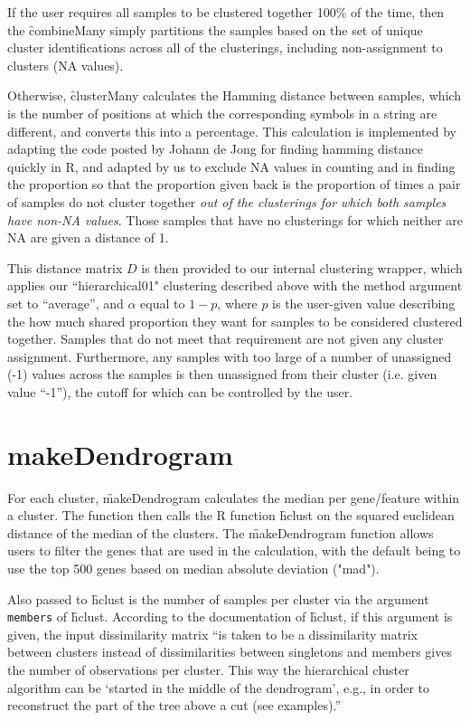 If the user requires all samples to be clustered together 100\% of the time, then the \f{combineMany} simply partitions the samples based on the set of unique cluster identifications across all of the clusterings, including non-assignment to clusters (NA values).  

Otherwise, \f{clusterMany} calculates the Hamming distance between samples, which is the number of positions at which the corresponding symbols in a string are different, and converts this into a percentage. This calculation is implemented by adapting the code posted by Johann de Jong \cite{hammingR} for finding hamming distance quickly in R, and adapted by us to exclude NA values in counting and in finding the proportion so that the proportion given back is the proportion of times a pair of samples do not cluster together \emph{out of the clusterings for which both samples have non-NA values}. Those samples that have no clusterings for which neither are NA are given a distance of 1. 



This distance matrix $D$ is then provided to our internal clustering wrapper, which applies our ``hierarchical01" clustering described above with the method argument set to ``average'', and $\alpha$ equal to $1-p$, where $p$ is the user-given value describing the how much shared proportion they want for samples to be considered clustered together. Samples that do not meet that requirement are not given any cluster assignment. Furthermore, any samples with too large of a number of unassigned (-1) values across the samples is then unassigned from their cluster (i.e. given value ``-1''), the cutoff for which can be controlled by the user. 

\section{makeDendrogram}
For each cluster, \f{makeDendrogram} calculates the median per gene/feature within a cluster. The function then calls the R function \f{hclust} on the squared euclidean distance of the median of the clusters. The \f{makeDendrogram} function allows users to filter the genes that are used in the calculation, with the default being to use the top 500 genes based on median absolute deviation ("mad"). 

Also passed to \f{hclust} is the number of samples per cluster via the argument \texttt{members} of \f{hclust}. According to the documentation of \f{hclust}, if this argument is given, the input dissimilarity matrix ``is taken to be a dissimilarity matrix between clusters instead of dissimilarities between singletons and members gives the number of observations per cluster. This way the hierarchical cluster algorithm can be ‘started in the middle of the dendrogram’, e.g., in order to reconstruct the part of the tree above a cut (see examples).''


